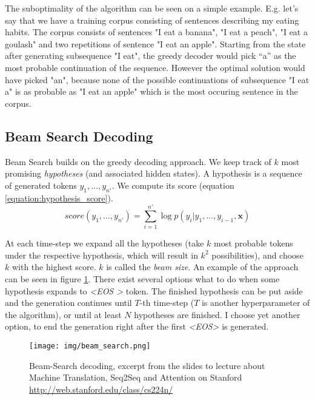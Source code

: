 The suboptimality of the algorithm can be seen on a simple example. E.g. let's say that we have a training corpus consisting of sentences describing my eating habits. The corpus consists of sentences "I eat a banana", "I eat a peach", "I eat a goulash" and two repetitions of sentence "I eat an apple". Starting from the state after generating subsequence "I eat", the greedy decoder would pick ``a'' as the most probable continuation of the sequence. However the optimal solution would have picked "an", because none of the possible continuations of subsequence "I eat a" is as probable as "I eat an apple" which is the most occuring sentence in the corpus.

\subsection{Beam Search Decoding}

Beam Search builds on the greedy decoding approach. We keep track of $k$ most promising \emph{hypotheses} (and associated hidden states). A hypothesis is a sequence of generated tokens $y_1,\dots,y_{n'}$. We compute its score (equation \ref{equation:hypothesis_score}).
\begin{equation} \label{equation:hypothesis_score}
    score(y_1,\dots,y_{n'}) = \sum_{i=1}^{n'}{\log{p(y_i | y_1, \dots, y_{i-1}, \boldsymbol{x})}}
\end{equation}

At each time-step we expand all the hypotheses (take $k$ most probable tokens under the respective hypothesis, which will result in $k^2$ possibilities), and choose $k$ with the highest score. $k$ is called the \emph{beam size}. An example of the approach can be seen in figure \ref{figure:beam_search}. There exist several options what to do when some hypothesis expands to \emph{\textless EOS \textgreater} token. The finished hypothesis can be put aside and the generation continues until $T$-th time-step ($T$ is another hyperparameter of the algorithm), or until at least $N$ hypotheses are finished. I choose yet another option, to end the generation right after the first \emph{\textless EOS\textgreater} is generated.

\begin{figure}[!h]
    \centering
    \texttt{[image: img/beam\_search.png]}
    \caption{\centering Beam-Search decoding, excerpt from the slides to lecture about Machine Translation, Seq2Seq and Attention on Stanford \url{http://web.stanford.edu/class/cs224n/}} \label{figure:beam_search}
\end{figure}

